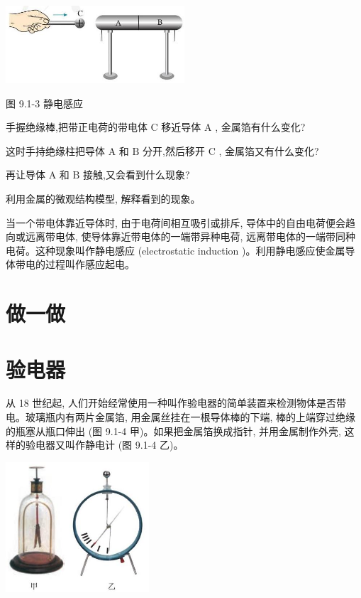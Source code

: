 \documentclass[10pt]{article}
\begin{document}
\begin{center}
\includegraphics[max width=0.5\textwidth]{images/01911d5f-8e38-70c0-b5b8-2b399bd115b6_8_901929.jpg}
\end{center}

图 9.1-3 静电感应

手握绝缘棒,把带正电荷的带电体 \(\mathrm{C}\) 移近导体 \(\mathrm{A}\) , 金属箔有什么变化?

这时手持绝缘柱把导体 \(\mathrm{A}\) 和 \(\mathrm{B}\) 分开,然后移开 \(\mathrm{C}\) , 金属箔又有什么变化?

再让导体 \(\mathrm{A}\) 和 \(\mathrm{B}\) 接触,又会看到什么现象?

利用金属的微观结构模型, 解释看到的现象。

当一个带电体靠近导体时, 由于电荷间相互吸引或排斥, 导体中的自由电荷便会趋向或远离带电体, 使导体靠近带电体的一端带异种电荷, 远离带电体的一端带同种电荷。这种现象叫作静电感应 (electrostatic induction )。利用静电感应使金属导体带电的过程叫作感应起电。

\section*{做一做}

\section*{验电器}

从 18 世纪起, 人们开始经常使用一种叫作验电器的简单装置来检测物体是否带电。玻璃瓶内有两片金属箔, 用金属丝挂在一根导体棒的下端, 棒的上端穿过绝缘的瓶塞从瓶口伸出 (图 9.1-4 甲)。如果把金属箔换成指针, 并用金属制作外壳, 这样的验电器又叫作静电计 (图 9.1-4 乙)。

\begin{center}
\includegraphics[max width=0.4\textwidth]{images/01911d5f-8e38-70c0-b5b8-2b399bd115b6_9_794596.jpg}
\end{center}
\end{document}
